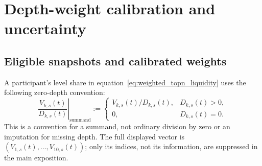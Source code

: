 \section{Depth-weight calibration and uncertainty}
\label{sec:depth_calibration}
\subsection{Eligible snapshots and calibrated weights}
A participant's level share in equation~\eqref{eq:weighted_topn_liquidity} uses the following zero-depth convention:
\begin{equation}
    \left.\frac{V_{k,s}(t)}{D_{k,s}(t)}\right|_{\text{summand}}
    :=
    \begin{cases}
        V_{k,s}(t)/D_{k,s}(t),&D_{k,s}(t)>0,\\
        0,&D_{k,s}(t)=0.
    \end{cases}
    \label{eq:relative_agent_depth}
\end{equation}
This is a convention for a summand, not ordinary division by zero or an imputation for missing depth. The full displayed vector is $(V_{1,s}(t),\ldots,V_{10,s}(t))$; only its indices, not its information, are suppressed in the main exposition.

